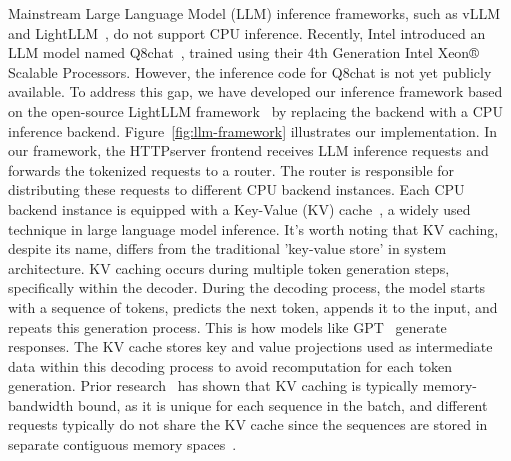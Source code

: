 Mainstream Large Language Model (LLM) inference frameworks, such as vLLM~\cite{vllm} and LightLLM~\cite{lightllm}, do not support CPU inference. Recently, Intel introduced an LLM model named Q8chat~\cite{q8chat}, trained using their 4th Generation Intel Xeon® Scalable Processors. However, the inference code for Q8chat is not yet publicly available. 
To address this gap, we have developed our inference framework based on the open-source LightLLM framework~\cite{lightllm} by replacing the backend with a CPU inference backend. Figure~\ref{fig:llm-framework} illustrates our implementation.
In our framework, the HTTPserver frontend receives LLM inference requests and forwards the tokenized requests to a router. The router is responsible for distributing these requests to different CPU backend instances. Each CPU backend instance is equipped with a Key-Value (KV) cache~\cite{kvcache}, a widely used technique in large language model inference. It's worth noting that KV caching, despite its name, differs from the traditional 'key-value store' in system architecture. KV caching occurs during multiple token generation steps, specifically within the decoder. During the decoding process, the model starts with a sequence of tokens, predicts the next token, appends it to the input, and repeats this generation process. This is how models like GPT~\cite{gpt4} generate responses. The KV cache stores key and value projections used as intermediate data within this decoding process to avoid recomputation for each token generation. Prior research~\cite{kvcache} has shown that KV caching is typically memory-bandwidth bound, as it is unique for each sequence in the batch, and different requests typically do not share the KV cache since the sequences are stored in separate contiguous memory spaces~\cite{vllmpaper}.



